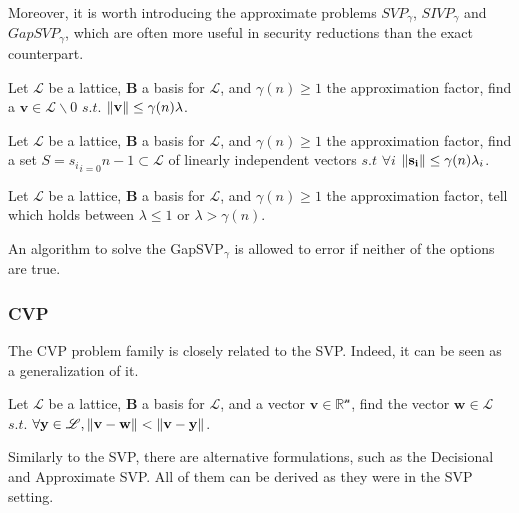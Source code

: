 Moreover, it is worth introducing the approximate problems $SVP_\gamma$, $SIVP_\gamma$ and $GapSVP_\gamma$, which are often more useful in security reductions than the exact counterpart.

\begin{definition}
Let $\mathscr{L}$ be a lattice, $\mathbf{B}$ a basis for $\mathscr{L}$, and $\gamma(n)\geq1$ the approximation factor, find a $\mathbf{v}\in\mathscr{L}\backslash0$ $s.t.$ $\left\lVert \mathbf{v} \right\rVert \leq \gamma(n)\lambda$.
\end{definition}

\begin{definition}
Let $\mathscr{L}$ be a lattice, $\mathbf{B}$ a basis for $\mathscr{L}$, and $\gamma(n)\geq1$ the approximation factor, find a set $S={s_i}_{i=0}{n-1}\subset \mathscr{L}$ of linearly independent vectors $s.t$ $\forall i$ $\left\lVert \mathbf{s_i} \right\rVert \leq \gamma(n)\lambda_i$.
\end{definition}

\begin{definition}
Let $\mathscr{L}$ be a lattice, $\mathbf{B}$ a basis for $\mathscr{L}$, and $\gamma(n)\geq1$ the approximation factor, tell which holds between $\lambda\leq1$ or $\lambda > \gamma(n)$.
\end{definition}
\begin{remark}
An algorithm to solve the GapSVP$_\gamma$ is allowed to error if neither of the options are true.
\end{remark}

\subsubsection{CVP}
The CVP problem family is closely related to the SVP. Indeed, it can be seen as a generalization of it.

\begin{definition}
Let $\mathscr{L}$ be a lattice, $\mathbf{B}$ a basis for $\mathscr{L}$, and a vector $\mathbf{v}\in\mathscr{\mathbb{R}^n}$, find the vector $\mathbf{w}\in\mathscr{L}$ $s.t.$ $\forall\mathbf{y}\in\mathscr{L},\left\lVert \mathbf{v}-\mathbf{w} \right\rVert < \left\lVert \mathbf{v}-\mathbf{y} \right\rVert$.
\end{definition}

Similarly to the SVP, there are alternative formulations, such as the Decisional and Approximate SVP. All of them can be derived as they were in the SVP setting.

